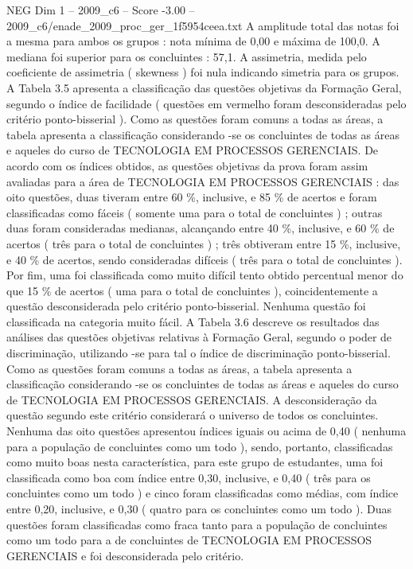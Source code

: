 \begin{textsample}{NEG Dim 1 – 2009\_c6 – Score -3.00 – 2009\_c6/enade\_2009\_proc\_ger\_1f5954ceea.txt}
A amplitude total das notas foi a mesma para ambos os grupos : nota mínima de 0,00 e máxima de 100,0.
A mediana foi superior para os concluintes : 57,1.
A assimetria, medida pelo coeficiente de assimetria ( skewness ) foi nula indicando simetria para os grupos.
A Tabela 3.5 apresenta a classificação das questões objetivas da Formação Geral, segundo o índice de facilidade ( questões em vermelho foram desconsideradas pelo critério ponto-bisserial ).
Como as questões foram comuns a todas as áreas, a tabela apresenta a classificação considerando -se os concluintes de todas as áreas e aqueles do curso de TECNOLOGIA EM PROCESSOS GERENCIAIS.
De acordo com os índices obtidos, as questões objetivas da prova foram assim avaliadas para a área de TECNOLOGIA EM PROCESSOS GERENCIAIS : das oito questões, duas tiveram entre 60 \%, inclusive, e 85 \% de acertos e foram classificadas como fáceis ( somente uma para o total de concluintes ) ; outras duas foram consideradas medianas, alcançando entre 40 \%, inclusive, e 60 \% de acertos ( três para o total de concluintes ) ; três obtiveram entre 15 \%, inclusive, e 40 \% de acertos, sendo consideradas difíceis ( três para o total de concluintes ).
Por fim, uma foi classificada como muito difícil tento obtido percentual menor do que 15 \% de acertos ( uma para o total de concluintes ), coincidentemente a questão desconsiderada pelo critério ponto-bisserial.
Nenhuma questão foi classificada na categoria muito fácil.
A Tabela 3.6 descreve os resultados das análises das questões objetivas relativas à Formação Geral, segundo o poder de discriminação, utilizando -se para tal o índice de discriminação ponto-bisserial.
Como as questões foram comuns a todas as áreas, a tabela apresenta a classificação considerando -se os concluintes de todas as áreas e aqueles do curso de TECNOLOGIA EM PROCESSOS GERENCIAIS.
A desconsideração da questão segundo este critério considerará o universo de todos os concluintes.
Nenhuma das oito questões apresentou índices iguais ou acima de 0,40 ( nenhuma para a população de concluintes como um todo ), sendo, portanto, classificadas como muito boas nesta característica, para este grupo de estudantes, uma foi classificada como boa com índice entre 0,30, inclusive, e 0,40 ( três para os concluintes como um todo ) e cinco foram classificadas como médias, com índice entre 0,20, inclusive, e 0,30 ( quatro para os concluintes como um todo ).
Duas questões foram classificadas como fraca tanto para a população de concluintes como um todo para a de concluintes de TECNOLOGIA EM PROCESSOS GERENCIAIS e foi desconsiderada pelo critério.

\end{textsample}
